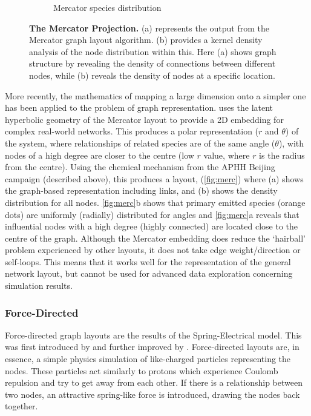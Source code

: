 \begin{figure}[H]
\begin{subfigure}[b]{.495\textwidth}
     \caption{Mercator species distribution}
     \end{subfigure}
        \caption{\textbf{The Mercator Projection.} (a) represents the output from the Mercator graph layout algorithm. (b) provides a kernel density analysis of the node distribution within this. Here (a) shows graph structure by revealing the density of connections between different nodes, while (b) reveals the density of nodes at a specific location. }
        \label{fig:merc}
\end{figure}

More recently, the mathematics of mapping a large dimension onto a simpler one has been applied to the problem of graph representation. \citep{mercgraph} uses the latent hyperbolic geometry of the Mercator layout to provide a 2D embedding for complex real-world networks. This produces a polar representation ($r$ and $\theta$) of the system, where relationships of related species are of the same angle ($\theta$), with nodes of a high degree are closer to the centre (low $r$ value, where $r$ is the radius from the centre). Using the chemical mechanism from the APHH  Beijing campaign (described above), this produces a layout, (\autoref{fig:merc}) where (a) shows the graph-based representation including links, and (b) shows the density distribution for all nodes. \autoref{fig:merc}b shows that primary emitted species (orange dots) are uniformly (radially) distributed for angles and \autoref{fig:merc}a reveals that influential nodes with a high degree (highly connected) are located close to the centre of the graph. Although the Mercator embedding does reduce the `hairball' problem experienced by other layouts, it does not take edge weight/direction or self-loops. This means that it works well for the representation of the general network layout, but cannot be used for advanced data exploration concerning simulation results.  



\subsubsection{Force-Directed}\label{sec:forcedirected}

Force-directed graph layouts are the results of the Spring-Electrical model. This was first introduced by \citep{Eades} and further improved by \citep{raingold}. Force-directed layouts are, in essence, a simple physics simulation of like-charged particles representing the nodes. These particles act similarly to protons which experience Coulomb repulsion and try to get away from each other. If there is a relationship between two nodes, an attractive spring-like force is introduced, drawing the nodes back together. 

